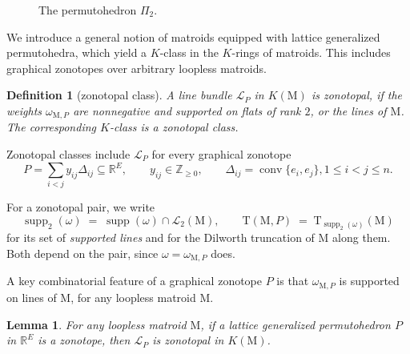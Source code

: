\documentclass[11pt,a4paper,reqno]{amsart}
\theoremstyle{results}
\newtheorem{lemma}[thm]{Lemma}
\theoremstyle{definitions}
\newtheorem{definition}[thm]{Definition}
\def\Z{\mathbb{Z}}
\def\R{\mathbb{R}}
\def\Z{\mathbb{Z}}
\newcommand{\M}{\mathrm{M}}
\renewcommand{\L}{\mathcal{L}}
\DeclareMathOperator{\supp}{supp}
\newcommand{\cL}{\mathcal{L}}
\newcommand{\Lines}{\mathcal{L}_2}
\newcommand{\DT}{\mathrm{T}}      %
\begin{document}
\begin{figure}[ht]
\caption{The permutohedron $\Pi_2$.}
\label{fig:permutohedron}
\end{figure}

We introduce a general notion of matroids equipped with lattice generalized permutohedra, which yield a $K$-class in the $K$-rings of matroids.
This includes graphical zonotopes over arbitrary loopless matroids.

\begin{definition}[zonotopal class]\label{def:zonotopal-class}
  A line bundle $\L_{P}$ in $K(\M)$ is \emph{zonotopal}, if the weights $\omega_{\M, P}$ are nonnegative and supported on flats of rank $2$, or the \emph{lines} of $\M$. The corresponding $K$-class is a \emph{zonotopal class}.  
\end{definition}

Zonotopal classes include $\cL_{P}$ for every graphical zonotope
\[
  P=\sum_{i<j}y_{ij}\Delta_{ij}\subseteq\R^E,
  \qquad y_{ij}\in\Z_{\geqslant0}, \qquad \Delta_{ij}=\operatorname{conv}\{e_i,e_j\}, 1 \leqslant i < j \leqslant n. 
\] 

For a zonotopal pair, we write
\[
  \supp_2(\omega) \;=\; \supp(\omega) \cap \Lines(\M),
  \qquad
  \DT(\M,P) \;=\; \DT_{\supp_2(\omega)}(\M)
\]
for its set of \emph{supported lines} and for the Dilworth truncation of $\M$
along them.  Both depend on the pair, since $\omega = \omega_{\M,P}$ does.

A key combinatorial feature of a graphical zonotope $P$ is that $\omega_{\M, P}$ is supported on lines of $\M$, for any loopless matroid $\M$.
\begin{lemma}\label{lem:zonotope-is-zonotopal}
  For any loopless matroid $\M$, if a lattice generalized permutohedron $P$ in $\R^{E}$ is a zonotope, then $\cL_P$ is zonotopal in $K(\M)$.
\end{lemma}
\end{document}
